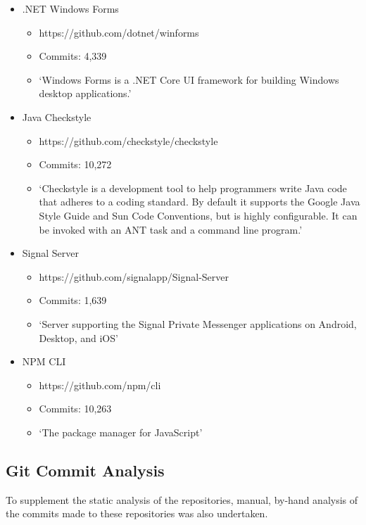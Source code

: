 \documentclass{article}
\begin{document}
            \begin{itemize}
                \item .NET Windows Forms
                \begin{itemize}
                    \item https://github.com/dotnet/winforms
                    \item Commits: 4,339
                    \item `Windows Forms is a .NET Core UI framework for building Windows desktop applications.'
                \end{itemize}
                \item Java Checkstyle
                \begin{itemize}
                    \item https://github.com/checkstyle/checkstyle
                    \item Commits: 10,272
                    \item `Checkstyle is a development tool to help programmers write Java code that adheres to a coding standard. By default it supports the Google Java Style Guide and Sun Code Conventions, but is highly configurable. It can be invoked with an ANT task and a command line program.'
                \end{itemize}
                \item Signal Server
                \begin{itemize}
                    \item https://github.com/signalapp/Signal-Server
                    \item Commits: 1,639
                    \item `Server supporting the Signal Private Messenger applications on Android, Desktop, and iOS'
                \end{itemize}
                \item NPM CLI
                \begin{itemize}
                    \item https://github.com/npm/cli
                    \item Commits: 10,263
                    \item `The package manager for JavaScript'
                \end{itemize}
            \end{itemize}
    \subsection{Git Commit Analysis}
        To supplement the static analysis of the repositories, manual, by-hand analysis of the commits made to these repositories was also undertaken.
\end{document}
